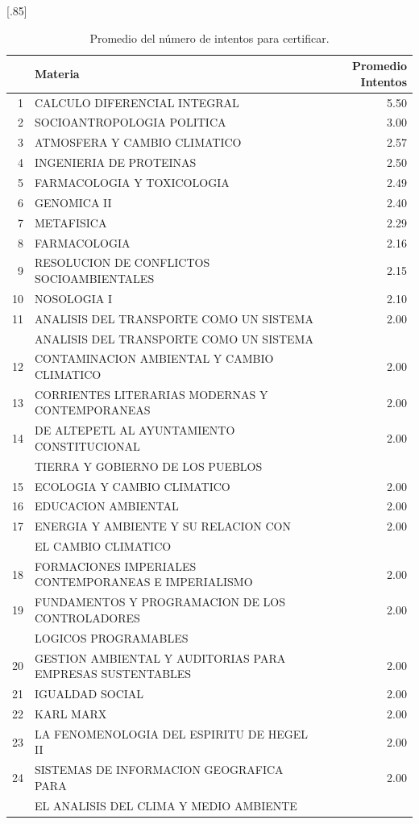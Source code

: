 \documentclass[12pt]{article}
\begin{document}
\begin{table}[ht]
\centering
\scalebox{0.75}[.85]{
\begin{tabular}{rlr}
  \hline
 & Materia & Promedio Intentos \\ 
  \hline
1 & CALCULO DIFERENCIAL INTEGRAL & 5.50 \\ 
  2 & SOCIOANTROPOLOGIA POLITICA & 3.00 \\ 
  3 & ATMOSFERA Y CAMBIO CLIMATICO & 2.57 \\ 
  4 & INGENIERIA DE PROTEINAS & 2.50 \\ 
  5 & FARMACOLOGIA Y TOXICOLOGIA & 2.49 \\ 
  6 & GENOMICA II & 2.40 \\ 
  7 & METAFISICA & 2.29 \\ 
  8 & FARMACOLOGIA & 2.16 \\ 
  9 & RESOLUCION DE CONFLICTOS SOCIOAMBIENTALES & 2.15 \\ 
  10 & NOSOLOGIA I & 2.10 \\ 
  11 & ANALISIS DEL TRANSPORTE COMO UN SISTEMA  & 2.00 \\ 
   & ANALISIS DEL TRANSPORTE COMO UN SISTEMA  &  \\ 
  12 & CONTAMINACION AMBIENTAL Y CAMBIO CLIMATICO & 2.00 \\ 
  13 & CORRIENTES LITERARIAS MODERNAS Y CONTEMPORANEAS & 2.00 \\ 
  14 & DE ALTEPETL AL AYUNTAMIENTO CONSTITUCIONAL & 2.00 \\ 
   & TIERRA Y GOBIERNO DE LOS PUEBLOS & \\ 
  15 & ECOLOGIA Y CAMBIO CLIMATICO & 2.00 \\ 
  16 & EDUCACION AMBIENTAL & 2.00 \\ 
  17 & ENERGIA Y AMBIENTE Y SU RELACION CON & 2.00 \\ 
  & EL CAMBIO CLIMATICO &  \\ 
  18 & FORMACIONES IMPERIALES CONTEMPORANEAS E IMPERIALISMO & 2.00 \\ 
  19 & FUNDAMENTOS Y PROGRAMACION DE LOS CONTROLADORES & 2.00 \\ 
  & LOGICOS PROGRAMABLES &  \\ 
  20 & GESTION AMBIENTAL Y AUDITORIAS PARA EMPRESAS SUSTENTABLES & 2.00 \\ 
  21 & IGUALDAD SOCIAL & 2.00 \\ 
  22 & KARL MARX & 2.00 \\ 
  23 & LA FENOMENOLOGIA DEL ESPIRITU DE HEGEL II & 2.00 \\ 
  24 & SISTEMAS DE INFORMACION GEOGRAFICA PARA& 2.00 \\ 
     & EL ANALISIS DEL CLIMA Y MEDIO AMBIENTE & \\ 
   \hline
\end{tabular}
}\caption{\label{Promedio_Intentos_Si_Certificaron} Promedio del n\'umero  de intentos para certificar.}

\end{table}
\end{document}
